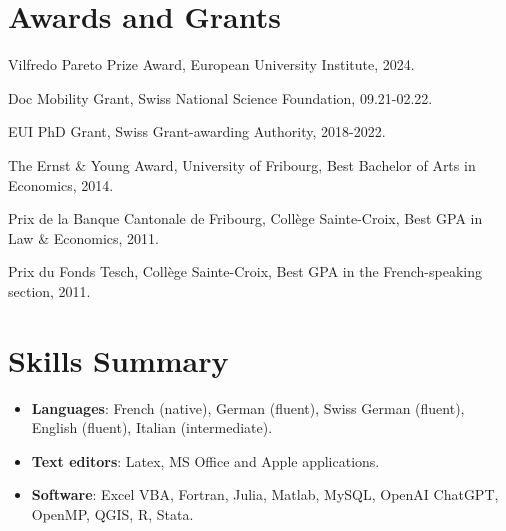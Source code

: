 \documentclass[letterpaper,11pt]{article}
\newcommand{\resumeItem}[2]{
  \item\small{
    \textbf{#1}{: #2 \vspace{-2pt}}
  }
}
\newcommand{\resumeSubItem}[2]{\resumeItem{#1}{#2}\vspace{-1pt}}
\newcommand{\resumeSubHeadingListStart}{\begin{itemize}[leftmargin=*]}
\newcommand{\resumeSubHeadingListEnd}{\end{itemize}}
\begin{document}
\section{Awards and Grants}
\begin{description}[font=$\bullet$]
\item {Vilfredo Pareto Prize Award, European University Institute, 2024.} 
\item {Doc Mobility Grant, Swiss National Science Foundation, 09.21-02.22.} 
\item {EUI PhD Grant, Swiss Grant-awarding Authority, 2018-2022.} 
\item {The Ernst \& Young Award, University of Fribourg, Best Bachelor of Arts in Economics, 2014.} 
\item {Prix de la Banque Cantonale de Fribourg, Coll\`{e}ge Sainte-Croix, Best GPA in Law \& Economics, 2011.}
\item {Prix du Fonds Tesch, Coll\`{e}ge Sainte-Croix, Best GPA in the French-speaking section, 2011.}
\end{description}


%
\section{Skills Summary}
	\resumeSubHeadingListStart
	\resumeSubItem{Languages}{French (native), German (fluent), Swiss German (fluent), English (fluent), Italian (intermediate).}
	\resumeSubItem{Text editors}{Latex, MS Office and Apple applications.}
	\resumeSubItem{Software}{Excel VBA, Fortran, Julia, Matlab, MySQL, OpenAI ChatGPT, OpenMP, QGIS, R, Stata.}
\resumeSubHeadingListEnd

\end{document}

